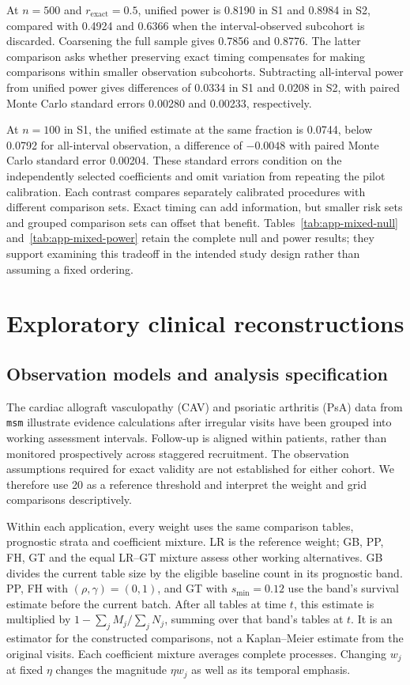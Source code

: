 \documentclass[12pt]{article}
\theoremstyle{definition}
\theoremstyle{remark}
\begin{document}
At $n=500$ and $r_{\mathrm{exact}}=0.5$, unified power is 0.8190 in S1 and 0.8984 in S2, compared with 0.4924 and 0.6366 when the interval-observed subcohort is discarded. Coarsening the full sample gives 0.7856 and 0.8776. The latter comparison asks whether preserving exact timing compensates for making comparisons within smaller observation subcohorts. Subtracting all-interval power from unified power gives differences of 0.0334 in S1 and 0.0208 in S2, with paired Monte Carlo standard errors 0.00280 and 0.00233, respectively.

At $n=100$ in S1, the unified estimate at the same fraction is 0.0744, below 0.0792 for all-interval observation, a difference of $-0.0048$ with paired Monte Carlo standard error 0.00204. These standard errors condition on the independently selected coefficients and omit variation from repeating the pilot calibration. Each contrast compares separately calibrated procedures with different comparison sets. Exact timing can add information, but smaller risk sets and grouped comparison sets can offset that benefit. Tables~\ref{tab:app-mixed-null} and~\ref{tab:app-mixed-power} retain the complete null and power results; they support examining this tradeoff in the intended study design rather than assuming a fixed ordering.

\section{Exploratory clinical reconstructions}
\label{sec:clinical}

\subsection{Observation models and analysis specification}
\label{sec:application-plan}

The cardiac allograft vasculopathy (CAV) and psoriatic arthritis (PsA) data from \texttt{msm} illustrate evidence calculations after irregular visits have been grouped into working assessment intervals. Follow-up is aligned within patients, rather than monitored prospectively across staggered recruitment. The observation assumptions required for exact validity are not established for either cohort. We therefore use 20 as a reference threshold and interpret the weight and grid comparisons descriptively.

Within each application, every weight uses the same comparison tables, prognostic strata and coefficient mixture. LR is the reference weight; GB, PP, FH, GT and the equal LR--GT mixture assess other working alternatives. GB divides the current table size by the eligible baseline count in its prognostic band. PP, FH with $(\rho,\gamma)=(0,1)$, and GT with $s_{\min}=0.12$ use the band's survival estimate before the current batch. After all tables at time $t$, this estimate is multiplied by $1-\sum_j M_j/\sum_j N_j$, summing over that band's tables at $t$. It is an estimator for the constructed comparisons, not a Kaplan--Meier estimate from the original visits. Each coefficient mixture averages complete processes. Changing $w_j$ at fixed $\eta$ changes the magnitude $\eta w_j$ as well as its temporal emphasis.
\end{document}
